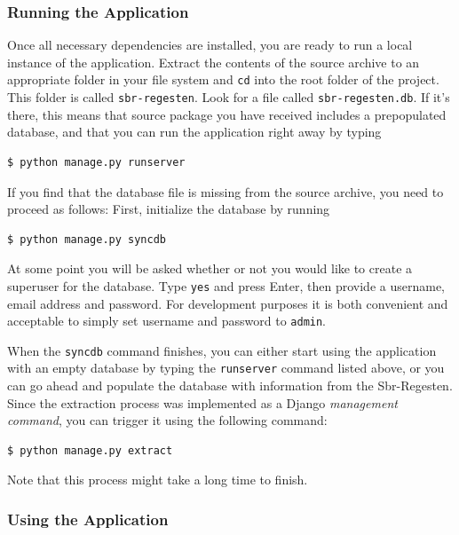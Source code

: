 \subsubsection{Running the Application}
\label{sec:run}

Once all necessary dependencies are installed, you are ready to run a
local instance of the application. Extract the contents of the source
archive to an appropriate folder in your file system and \texttt{cd}
into the root folder of the project. This folder is called
\texttt{sbr-regesten}. Look for a file called
\texttt{sbr-regesten.db}. If it's there, this means that source
package you have received includes a prepopulated database, and that
you can run the application right away by typing

\begin{verbatim}
$ python manage.py runserver
\end{verbatim}

If you find that the database file is missing from the source archive,
you need to proceed as follows: First, initialize the database by running

\begin{verbatim}
$ python manage.py syncdb
\end{verbatim}

At some point you will be asked whether or not you would like to
create a superuser for the database. Type \texttt{yes} and press
Enter, then provide a username, email address and password. For
development purposes it is both convenient and acceptable to simply
set username and password to \texttt{admin}.

When the \texttt{syncdb} command finishes, you can either start using
the application with an empty database by typing the
\texttt{runserver} command listed above, or you can go ahead and
populate the database with information from the Sbr-Regesten. Since
the extraction process was implemented as a Django \emph{management command},
you can trigger it using the following command:

\begin{verbatim}
$ python manage.py extract
\end{verbatim}

Note that this process might take a long time to finish.

\subsubsection{Using the Application}
\label{sec:use}

